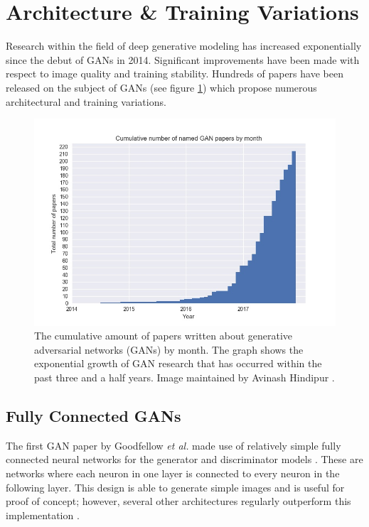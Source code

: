\documentclass[11pt]{article}
\begin{document}
\section{Architecture & Training Variations}
Research within the field of deep generative modeling has increased exponentially since the debut of GANs in 2014. Significant improvements have been made with respect to image quality and training stability. Hundreds of papers have been released on the subject of GANs (see figure \ref{fig:CumulativeNumberofGANPapersbyMonth}) which propose numerous architectural and training variations.

\begin{figure}
\centering
\includegraphics[scale=0.43]{cumulative_gans}
\caption{The cumulative amount of papers written about generative adversarial networks (GANs) by month. The graph shows the exponential growth of GAN research that has occurred within the past three and a half years. Image maintained by Avinash Hindipur \citep{November2017GANZoo}.}
\label{fig:CumulativeNumberofGANPapersbyMonth}
\end{figure}

\subsection{Fully Connected GANs}
The first GAN paper by Goodfellow \textit{et al.} made use of relatively simple fully connected neural networks for the generator and discriminator models \citep{2017arXiv171007035C}. These are networks where each neuron in one layer is connected to every neuron in the following layer. This design is able to generate simple images and is useful for proof of concept; however, several other architectures regularly outperform this implementation \citep{2017arXiv171007035C}.
\end{document}
